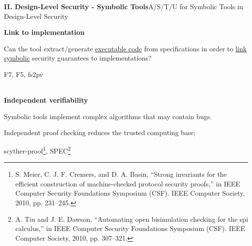 \documentclass[10pt,aspectratio=1610,compress,dvipsnames]{beamer}
\begin{document}
\begin{frame}[fragile]{\bfseries II. Design-Level Security - Symbolic Tools}{A/S/T/U for Symbolic Tools in Design-Level Security}
	\begin{description}[style=nextline]
		\item[\textbf{Trust (T)}] \textbf{Link to implementation}\\
		\item[$\to$] Can the tool extract/generate
		\underline{executable code} from specifications in order to \underline{link symbolic}
		security guarantees to implementations?\\
		\item[$\to$] F7, F5, fs2pv \\
		\item[] \; \\
		\textbf{Independent verifiability}
		\item[$\to$] Symbolic tools implement complex algorithms that may contain bugs. 
		\item[$\to$] Independent proof checking reduces the trusted computing base;
		\item[$\to$] scyther-proof\footnote{S. Meier, C. J. F. Cremers, and D. A. Basin, “Strong invariants for
			the efficient construction of machine-checked protocol security proofs,”
			in IEEE Computer Security Foundations Symposium (CSF). IEEE
			Computer Society, 2010, pp. 231–245.}, SPEC\footnote{A. Tiu and J. E. Dawson, “Automating open bisimulation checking for
			the spi calculus,” in IEEE Computer Security Foundations Symposium
			(CSF). IEEE Computer Society, 2010, pp. 307–321.}
		\item[]
	\end{description}
\end{frame}
\end{document}
